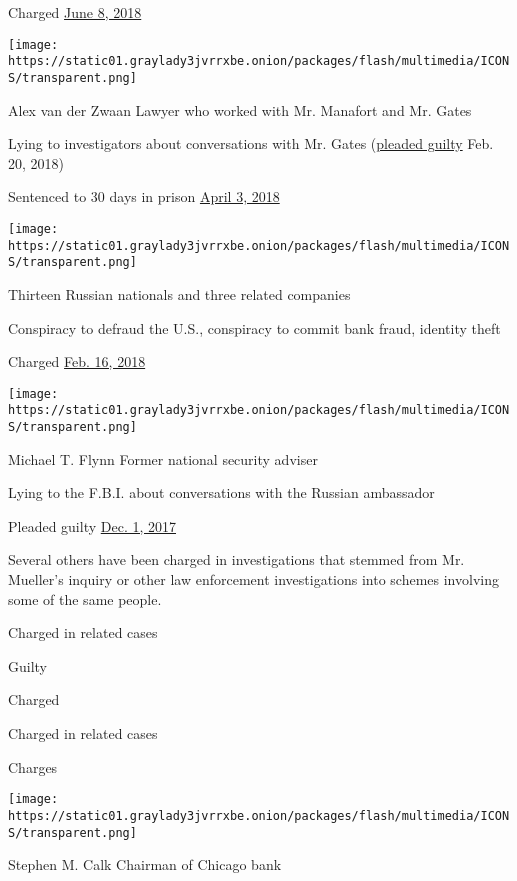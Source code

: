 Charged
\href{https://www.nytimes3xbfgragh.onion/2018/06/08/us/politics/manafort-obstruction-kilimnik-charges.html}{June
8, 2018}

\texttt{[image: https://static01.graylady3jvrrxbe.onion/packages/flash/multimedia/ICONS/transparent.png]}

Alex van der Zwaan Lawyer who worked with Mr. Manafort and Mr. Gates

Lying to investigators about conversations with Mr. Gates
(\href{https://www.nytimes3xbfgragh.onion/2018/02/20/us/politics/alex-van-der-zwaan-gates-russia-mueller.html}{pleaded
guilty} Feb. 20, 2018)

Sentenced to 30 days in prison
\href{https://www.nytimes3xbfgragh.onion/2018/04/03/us/alex-van-der-zwaan-sentencing-russia-investigation-mueller.html}{April
3, 2018}

\texttt{[image: https://static01.graylady3jvrrxbe.onion/packages/flash/multimedia/ICONS/transparent.png]}

Thirteen Russian nationals and three related companies

Conspiracy to defraud the U.S., conspiracy to commit bank fraud,
identity theft

Charged
\href{https://www.nytimes3xbfgragh.onion/2018/02/16/us/politics/russians-indicted-mueller-election-interference.html}{Feb.
16, 2018}

\texttt{[image: https://static01.graylady3jvrrxbe.onion/packages/flash/multimedia/ICONS/transparent.png]}

Michael T. Flynn Former national security adviser

Lying to the F.B.I. about conversations with the Russian ambassador

Pleaded guilty
\href{https://www.nytimes3xbfgragh.onion/2017/12/01/us/politics/michael-flynn-guilty-russia-investigation.html}{Dec.
1, 2017}

Several others have been charged in investigations that stemmed from Mr.
Mueller's inquiry or other law enforcement investigations into schemes
involving some of the same people.

Charged in related cases

Guilty

Charged

Charged in related cases

Charges

\texttt{[image: https://static01.graylady3jvrrxbe.onion/packages/flash/multimedia/ICONS/transparent.png]}

Stephen M. Calk Chairman of Chicago bank

